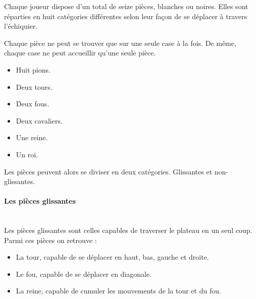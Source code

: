 \documentclass{article}
\begin{document}
Chaque joueur dispose d'un total de seize pièces, blanches ou noires. Elles sont réparties en huit catégories différentes selon leur façon de se déplacer à travers l'échiquier.

Chaque pièce ne peut se trouver que sur une seule case à la fois. De même, chaque case ne peut accueillir qu'une seule pièce.

\begin{itemize}
    \item Huit pions.
    \item Deux tours.
    \item Deux fous.
    \item Deux cavaliers.
    \item Une reine.
    \item Un roi.
\end{itemize}

Les pièces peuvent alors se diviser en deux catégories. Glissantes et non-glissantes.

\paragraph{Les pièces glissantes}
~~\\

Les pièces glissantes sont celles capables de traverser le plateau en un seul coup. Parmi ces pièces on retrouve :

\begin{itemize}
    \item La tour, capable de se déplacer en haut, bas, gauche et droite.
    \item Le fou, capable de se déplacer en diagonale.
    \item La reine, capable de cumuler les mouvements de la tour et du fou.
\end{itemize}
\end{document}
